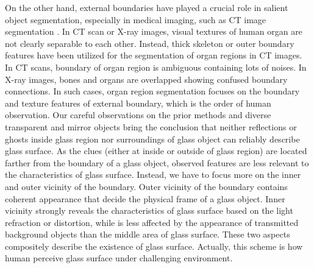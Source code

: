 \documentclass[10pt,twocolumn,letterpaper]{article}
\begin{document}
On the other hand, external boundaries have played a crucial role in salient object segmentation\cite{wei2020f3net}\cite{zhu2023sharp}\cite{qiao2023robustness}, especially in medical imaging, such as CT image segmentation\cite{ghadimi2015skull} \cite{shojaii2005automatic} \cite{bai2016automatic}. In CT scan or X-ray images, visual textures of human organ are not clearly separable to each other. Instead, thick skeleton or outer boundary features have been utilized for the segmentation of organ regions in CT images\cite{shojaii2005automatic}. 
In CT scans, boundary of organ region is ambiguous containing lots of noises. In X-ray images, bones and organs are overlapped showing confused boundary connections. In such cases, organ region segmentation focuses on the boundary and texture features of external boundary, which is the order of human observation\cite{ghadimi2015skull}.
Our careful observations on the prior methods and diverse transparent and mirror objects bring the conclusion that neither reflections or ghosts inside glass region nor surroundings of glass object can reliably describe glass surface. As the clues (either at inside or outside of glass region) are located farther from the boundary of a glass object, observed features are less relevant to the characteristics of glass surface. Instead, we have to focus more on the inner and outer vicinity of the boundary. Outer vicinity of the boundary contains coherent appearance that decide the physical frame of a glass object. Inner vicinity strongly reveals the characteristics of glass surface based on the light refraction or distortion, while is less affected by the appearance of transmitted background objects than the middle area of glass surface. These two aspects compositely describe the existence of glass surface. Actually, this scheme is how human perceive glass surface under challenging environment.
\end{document}

